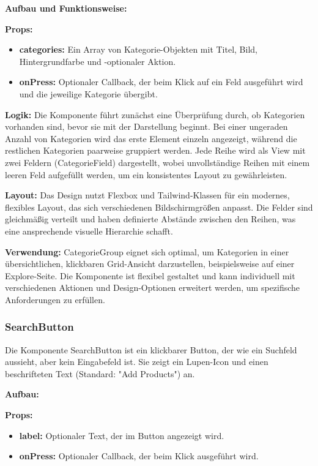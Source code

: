 \documentclass[12pt, a4paper]{report} %
\begin{document}
\noindent\textbf{Aufbau und Funktionsweise:}

\textbf{Props:}
\begin{itemize}
    \item \textbf{categories:} Ein Array von Kategorie-Objekten mit Titel, Bild, Hintergrundfarbe und -optionaler Aktion.
    \item \textbf{onPress:} Optionaler Callback, der beim Klick auf ein Feld ausgeführt wird und die jeweilige Kategorie übergibt.
\end{itemize}

\textbf{Logik:}
Die Komponente führt zunächst eine Überprüfung durch, ob Kategorien vorhanden sind, bevor sie mit der Darstellung beginnt. Bei einer ungeraden Anzahl von Kategorien wird das erste Element einzeln angezeigt, während die restlichen Kategorien paarweise gruppiert werden. Jede Reihe wird als View mit zwei Feldern (CategorieField) dargestellt, wobei unvollständige Reihen mit einem leeren Feld aufgefüllt werden, um ein konsistentes Layout zu gewährleisten.

\textbf{Layout:}
Das Design nutzt Flexbox und Tailwind-Klassen für ein modernes, flexibles Layout, das sich verschiedenen Bildschirmgrößen anpasst. Die Felder sind gleichmäßig verteilt und haben definierte Abstände zwischen den Reihen, was eine ansprechende visuelle Hierarchie schafft.

\noindent\textbf{Verwendung:} CategorieGroup eignet sich optimal, um Kategorien in einer übersichtlichen, klickbaren Grid-Ansicht darzustellen, beispielsweise auf einer Explore-Seite. Die Komponente ist flexibel gestaltet und kann individuell mit verschiedenen Aktionen und Design-Optionen erweitert werden, um spezifische Anforderungen zu erfüllen.

\subsubsection{SearchButton}
Die Komponente SearchButton ist ein klickbarer Button, der wie ein Suchfeld aussieht, aber kein Eingabefeld ist. Sie zeigt ein Lupen-Icon und einen beschrifteten Text (Standard: "Add Products") an.

\noindent\textbf{Aufbau:}

\textbf{Props:}
\begin{itemize}
    \item \textbf{label:} Optionaler Text, der im Button angezeigt wird.
    \item \textbf{onPress:} Optionaler Callback, der beim Klick ausgeführt wird.
\end{itemize}
\end{document}
